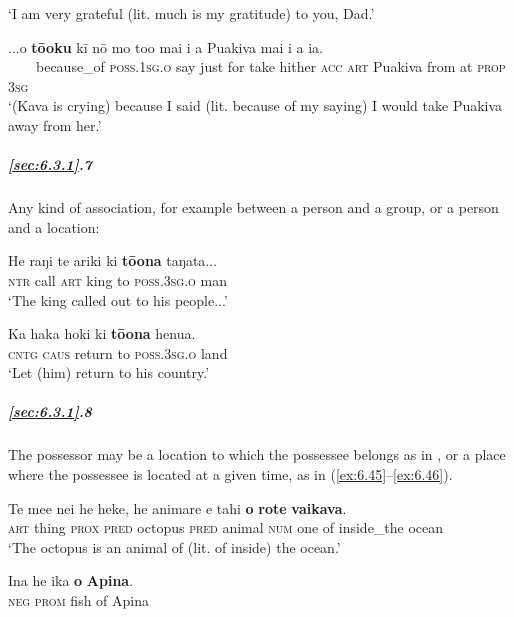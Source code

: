 \glt 
‘I am very grateful (lit. much is my gratitude) to you, Dad.’ \textstyleExampleref{[R363.112]} 
\z

\ea\label{ex:6.41}
\gll ...{\ꞌ}o \textbf{tō{\ꞌ}oku} kī nō mo to{\ꞌ}o mai i a Puakiva mai i a ia. \\
~~~~because\_of \textsc{poss.1sg.o} say just for take hither \textsc{acc} \textsc{art} Puakiva from at \textsc{prop} \textsc{3sg} \\

\glt 
‘(Kava is crying) because I said (lit. because of my saying) I would take Puakiva away from her.’ \textstyleExampleref{[R229.017]} 
\z

\subparagraph{\ref{sec:6.3.1}.7} Any kind of association, for example between a person and a group, or a person and a location:

\ea\label{ex:6.42}
\gll He raŋi te {\ꞌ}ariki ki \textbf{tō{\ꞌ}ona} taŋata... \\
\textsc{ntr} call \textsc{art} king to \textsc{poss.3sg.o} man \\

\glt 
‘The king called out to his people...’ \textstyleExampleref{[MsE-055.005]}
\z

\ea\label{ex:6.43}
\gll Ka haka hoki ki \textbf{tō{\ꞌ}ona} henua.\\
\textsc{cntg} \textsc{caus} return to \textsc{poss.3sg.o} land\\

\glt 
‘Let (him) return to his country.’ \textstyleExampleref{[Ley-9-63.065]}
\z

\subparagraph{\ref{sec:6.3.1}.8} The possessor may be a location to which the possessee belongs as in , or a place where the possessee is located at a given time, as in (\ref{ex:6.45}–\ref{ex:6.46}).

\ea\label{ex:6.44}
\gll Te me{\ꞌ}e nei he heke, he {\ꞌ}animare e tahi \textbf{o} \textbf{rote} \textbf{vaikava}. \\
\textsc{art} thing \textsc{prox} \textsc{pred} octopus \textsc{pred} animal \textsc{num} one of inside\_the ocean \\

\glt 
‘The octopus is an animal of (lit. of inside) the ocean.’ \textstyleExampleref{[R356.029]} 
\z

\ea\label{ex:6.45}
\gll {\ꞌ}Ina he ika \textbf{o} \textbf{{\ꞌ}Apina}. \\
\textsc{neg} \textsc{prom} fish of Apina \\

